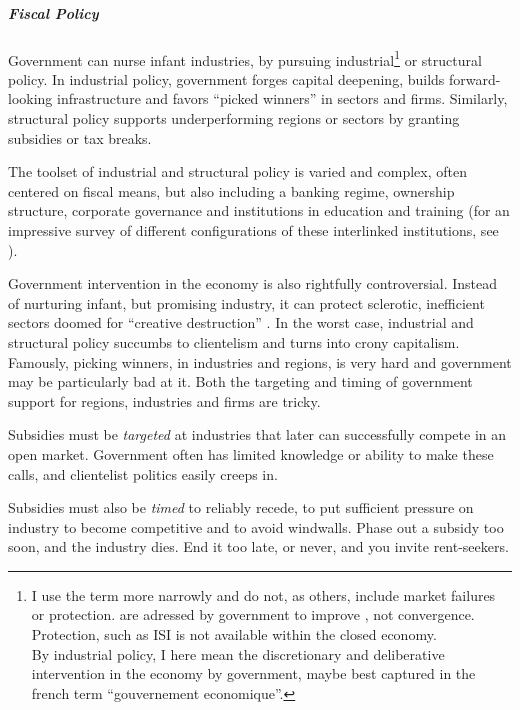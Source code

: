 \subparagraph{Fiscal Policy}
Government can nurse infant industries, by pursuing industrial\footnote{
	I use the term more narrowly and do not, as others, include  market failures or protection.  are adressed by government to improve , not convergence. Protection, such as \gls{ISI} is not available within the closed economy. \\
	By industrial policy, I here mean the discretionary and deliberative intervention in the economy by government, maybe best captured in the french term ``gouvernement economique''.} 
or structural policy. In industrial policy, government forges capital deepening, builds forward-looking infrastructure and favors ``picked winners'' in sectors and firms. Similarly, structural policy supports underperforming regions or sectors by granting subsidies or tax breaks. 

The toolset of industrial and structural policy is varied and complex, often centered on fiscal means, but also including a banking regime, ownership structure, corporate governance and institutions in education and training (for an impressive survey of different configurations of these interlinked institutions, see \citealt{HallSoskice-2001-aa}). 

Government intervention in the economy is also rightfully controversial. Instead of nurturing infant, but promising industry, it can protect sclerotic, inefficient sectors doomed for ``creative destruction'' \citep{SchumpeterSwedberg-1942-aa}. In the worst case, industrial and structural policy succumbs to clientelism and turns into crony capitalism.  Famously, picking winners, in industries and regions, is very hard and government may be particularly bad at it. Both the targeting and timing of government support for regions, industries and firms are tricky. 
\begin{inparaenum} 
	\item Subsidies must be \emph{targeted} at industries that later can successfully compete in an open market. Government often has limited knowledge or ability to make these calls, and clientelist politics easily creeps in. 
	\item Subsidies must also be \emph{timed} to reliably recede, to put sufficient pressure on industry to become competitive and to avoid windwalls. Phase out a subsidy too soon, and the industry dies. End it too late, or never, and you invite rent-seekers. 
\end{inparaenum}

